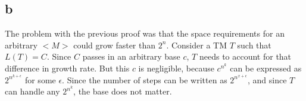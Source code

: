 \documentclass[letterpaper,notitlepage,twoside]{article}
\begin{document}
\subsection*{b}
The problem with the previous proof was that the space requirements for an arbitrary $<M>$ could grow faster than $2^n$. Consider a TM $T$ such that $L(T) = C$. Since $C$ passes in an arbitrary base $c$, $T$ needs to account for that difference in growth rate. But this $c$ is negligible, because $c^{n^k}$ can be expressed as $2^{n^{k + \epsilon}}$ for some $\epsilon$. Since the number of steps can be written as $2^{n^{x + \epsilon}}$, and since $T$ can handle any $2^{n^k}$, the base does not matter.
\end{document}
